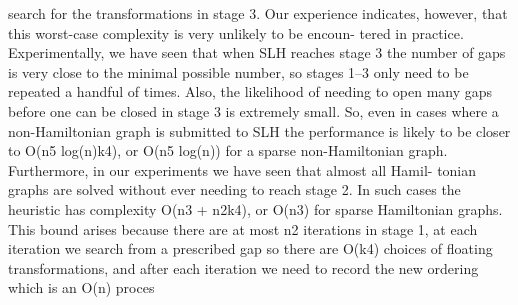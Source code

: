 \documentclass[10pt,a4paper]{article}
\begin{document}
search for the transformations in stage 3.
Our experience indicates, however, that this worst-case complexity is very unlikely to be encoun-
tered in practice. Experimentally, we have seen that when SLH reaches stage 3 the number of
gaps is very close to the minimal possible number, so stages 1–3 only need to be repeated a
handful of times. Also, the likelihood of needing to open many gaps before one can be closed
in stage 3 is extremely small. So, even in cases where a non-Hamiltonian graph is submitted
to SLH the performance is likely to be closer to O(n5 log(n)k4), or O(n5 log(n)) for a sparse
non-Hamiltonian graph. Furthermore, in our experiments we have seen that almost all Hamil-
tonian graphs are solved without ever needing to reach stage 2. In such cases the heuristic has
complexity O(n3 + n2k4), or O(n3) for sparse Hamiltonian graphs. This bound arises because
there are at most n2 iterations in stage 1, at each iteration we search from a prescribed gap so
there are O(k4) choices of floating transformations, and after each iteration we need to record
the new ordering which is an O(n) proces
\end{document}
